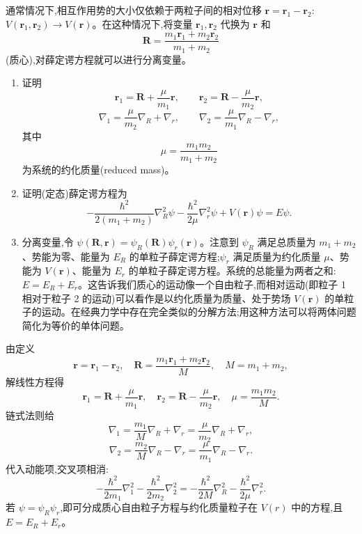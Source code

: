 \begin{question}
通常情况下,相互作用势的大小仅依赖于两粒子间的相对位移 $\mathbf r=\mathbf r_1-\mathbf r_2$:$V(\mathbf r_1,\mathbf r_2)\to V(\mathbf r)$。在这种情况下,将变量 $\mathbf r_1,\mathbf r_2$ 代换为 $\mathbf r$ 和
\[
\mathbf R=\frac{m_1\mathbf r_1+m_2\mathbf r_2}{m_1+m_2}
\]
(质心),对薛定谔方程就可以进行分离变量。
\begin{enumerate}
\item 证明
\[
\mathbf r_1=\mathbf R+\frac{\mu}{m_1}\mathbf r,\qquad
\mathbf r_2=\mathbf R-\frac{\mu}{m_2}\mathbf r,
\]
\[
\nabla_1=\frac{\mu}{m_2}\nabla_R+\nabla_r,\qquad
\nabla_2=\frac{\mu}{m_1}\nabla_R-\nabla_r,
\]
其中
\[
\mu=\frac{m_1m_2}{m_1+m_2}
\]
为系统的约化质量(reduced mass)。
\item 证明(定态)薛定谔方程为
\[
-\frac{\hbar^2}{2(m_1+m_2)}\nabla_R^2\psi
-\frac{\hbar^2}{2\mu}\nabla_r^2\psi+V(\mathbf r)\psi=E\psi.
\]
\item 分离变量,令 $\psi(\mathbf R,\mathbf r)=\psi_R(\mathbf R)\psi_r(\mathbf r)$。注意到 $\psi_R$ 满足总质量为 $m_1+m_2$、势能为零、能量为 $E_R$ 的单粒子薛定谔方程;$\psi_r$ 满足质量为约化质量 $\mu$、势能为 $V(\mathbf r)$、能量为 $E_r$ 的单粒子薛定谔方程。系统的总能量为两者之和:$E=E_R+E_r$。这告诉我们质心的运动像一个自由粒子,而相对运动(即粒子 1 相对于粒子 2 的运动)可以看作是以约化质量为质量、处于势场 $V(\mathbf r)$ 的单粒子的运动。在经典力学中存在完全类似的分解方法;用这种方法可以将两体问题简化为等价的单体问题。
\end{enumerate}
\begin{solution}

由定义
\[
\mathbf r=\mathbf r_1-\mathbf r_2,
\quad
\mathbf R=\frac{m_1\mathbf r_1+m_2\mathbf r_2}{M},\quad M=m_1+m_2,
\]
解线性方程得
\[
\mathbf r_1=\mathbf R+\frac{\mu}{m_1}\mathbf r,
\quad
\mathbf r_2=\mathbf R-\frac{\mu}{m_2}\mathbf r,
\quad \mu=\frac{m_1m_2}{M}.
\]
链式法则给
\[
\nabla_1=\frac{m_1}{M}\nabla_R+\nabla_r=\frac{\mu}{m_2}\nabla_R+\nabla_r,
\]
\[
\nabla_2=\frac{m_2}{M}\nabla_R-\nabla_r=\frac{\mu}{m_1}\nabla_R-\nabla_r.
\]
代入动能项,交叉项相消:
\[
-\frac{\hbar^2}{2m_1}\nabla_1^2-\frac{\hbar^2}{2m_2}\nabla_2^2
=-\frac{\hbar^2}{2M}\nabla_R^2-\frac{\hbar^2}{2\mu}\nabla_r^2.
\]
若 $\psi=\psi_R\psi_r$,即可分成质心自由粒子方程与约化质量粒子在 $V(r)$ 中的方程,且 $E=E_R+E_r$。

\end{solution}
\end{question}

